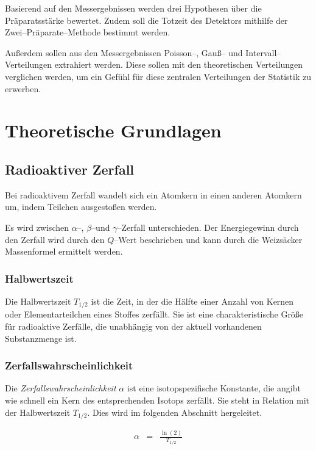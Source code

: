 \documentclass[12pt,a4paper]{scrartcl}
\numberwithin{equation}{section} %
\begin{document}
Basierend auf den Messergebnissen werden drei Hypothesen über die Präparatsstärke bewertet. Zudem soll die Totzeit des Detektors mithilfe der Zwei--Präparate--Methode bestimmt werden.

Außerdem sollen aus den Messergebnissen Poisson--, Gauß-- und Intervall--Verteilungen extrahiert werden. Diese sollen mit den theoretischen Verteilungen verglichen werden, um ein Gefühl für diese zentralen Verteilungen der Statistik zu erwerben.

\clearpage
\hypertarget{theoretische-grundlagen}{%
\section{Theoretische Grundlagen}\label{theoretische-grundlagen}}
\hypertarget{Radioaktiver Zerfall}{\subsection{Radioaktiver Zerfall}\label{Radioaktiver Zerfall}}
Bei radioaktivem Zerfall wandelt sich ein Atomkern in einen anderen Atomkern um, indem Teilchen ausgestoßen werden.

Es wird zwischen $\alpha$--, $\beta$--und $\gamma$--Zerfall unterschieden. Der Energiegewinn durch den Zerfall wird durch den $Q$--Wert beschrieben und kann durch die Weizsäcker Massenformel ermittelt werden.

\hypertarget{Halbwertszeit}{\subsubsection{Halbwertszeit}\label{Halbwertszeit}}
Die Halbwertszeit $T_{1/2}$ ist die Zeit, in der die Hälfte einer Anzahl von Kernen oder Elementarteilchen eines Stoffes zerfällt. Sie ist eine charakteristische Größe für radioaktive Zerfälle, die unabhängig von der aktuell vorhandenen Substanzmenge ist. \cite{Halbwertszeit}

\hypertarget{Zerfallswahrscheinlichkeit}{\subsubsection{Zerfallswahrscheinlichkeit}\label{Zerfallswahrscheinlichkeit}}
Die \emph{Zerfallswahrscheinlichkeit} $\alpha$ ist eine isotopspezifische Konstante, die angibt wie schnell ein Kern des entsprechenden Isotops zerfällt. Sie steht in Relation mit der Halbwertszeit $T_{1/2}$. Dies wird im folgenden Abschnitt hergeleitet.

\begin{eqnarray}
	\alpha &=& \frac{\ln{(2)}}{T_{1/2}} \label{eq:Zerfallswahrscheinlichkeit}
\end{eqnarray}
\end{document}
